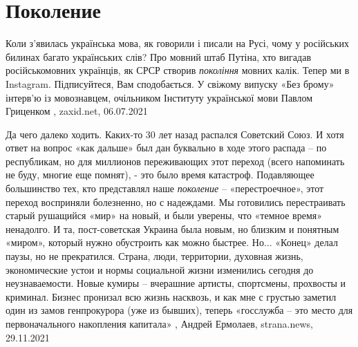  
 
 
 
 
\chapter{Поколение}
\label{sec:slova.pokolenie}

Коли з’явилась українська мова, як говорили і писали на Русі, чому у російських
билинах багато українських слів? Про мовний штаб Путіна, хто вигадав
російськомовних українців, як СРСР створив \emph{покоління} мовних калік.
Тепер ми в Instagram. Підписуйтеся, Вам сподобається.  У свіжому випуску «Без
брому» інтерв’ю із мовознавцем, очільником Інституту української мови Павлом
Гриценком
, 
zaxid.net, 06.07.2021

Да чего далеко ходить. Каких-то 30 лет назад распался Советский Союз. И хотя
ответ на вопрос «как дальше» был дан буквально в ходе этого распада – по
республикам, но для миллионов переживающих этот переход (всего напоминать не
буду, многие еще помнят), - это было время катастроф.  Подавляющее большинство
тех, кто представлял наше \emph{поколение} – «перестроечное», этот переход
восприняли болезненно, но с надеждами. Мы готовились перестраивать старый
рушащийся «мир» на новый, и были уверены, что «темное время» ненадолго.  И та,
пост-советская Украина была новым, но близким и понятным «миром», который нужно
обустроить как можно быстрее.  Но... «Конец» делал паузы, но не прекратился.
Страна, люди, территории, духовная жизнь, экономические устои и нормы
социальной жизни изменились сегодня до неузнаваемости. Новые кумиры – вчерашние
артисты, спортсмены, прохвосты и криминал. Бизнес пронизал всю жизнь насквозь,
и как мне с грустью заметил один из замов генпрокурора (уже из бывших), теперь
«госслужба – это место для первоначального накопления капитала»
, Андрей Ермолаев, strana.news, 29.11.2021
